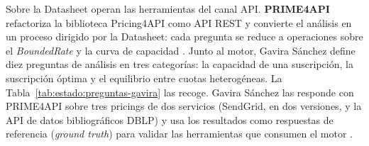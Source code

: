 Sobre la Datasheet operan las herramientas del canal API.
\textbf{PRIME4API} refactoriza la biblioteca Pricing4API como API REST y
convierte el análisis en un proceso dirigido por la Datasheet: cada
pregunta se reduce a operaciones sobre el \textit{BoundedRate} y la curva de
capacidad \citep{gavira2026tfm}. Junto al motor, Gavira Sánchez define
diez preguntas de análisis en tres categorías: la
capacidad de una suscripción, la suscripción óptima y el
equilibrio entre cuotas heterogéneas. La
Tabla~\ref{tab:estado:preguntas-gavira} las recoge.
Gavira Sánchez las responde con PRIME4API sobre tres pricings de dos servicios (SendGrid,
en dos versiones, y la API de datos bibliográficos DBLP) y usa los
resultados como respuestas de referencia (\textit{ground truth}) para
validar las herramientas que consumen el motor
\citep{gavira2026tfm}.

